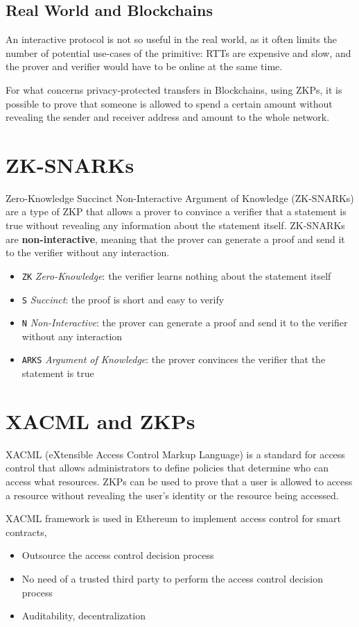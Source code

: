 \subsection{Real World and Blockchains}

An interactive protocol is not so useful in the real world, as it often limits the number of potential use-cases of the primitive:
RTTs are expensive and slow, and the prover and verifier would have to be online at the same time.

For what concerns privacy-protected transfers in Blockchains, using ZKPs, it is possible to prove that someone is allowed to spend a certain amount without revealing the sender and receiver address and amount to the whole network.

\section{ZK-SNARKs}

Zero-Knowledge Succinct Non-Interactive Argument of Knowledge (ZK-SNARKs) are a type of ZKP that allows a prover to convince a verifier that a statement is true without revealing any information about the statement itself. ZK-SNARKs are \textbf{non-interactive}, meaning that the prover can generate a proof and send it to the verifier without any interaction.
\begin{itemize}
   \item \texttt{ZK} \textit{Zero-Knowledge}: the verifier learns nothing about the statement itself
   \item \texttt{S} \textit{Succinct}: the proof is short and easy to verify
   \item \texttt{N} \textit{Non-Interactive}: the prover can generate a proof and send it to the verifier without any interaction
   \item \texttt{ARKS} \textit{Argument of Knowledge}: the prover convinces the verifier that the statement is true
\end{itemize}

\section{XACML and ZKPs}
XACML (eXtensible Access Control Markup Language) is a standard for access control that allows administrators to define policies that determine who can access what resources. ZKPs can be used to prove that a user is allowed to access a resource without revealing the user's identity or the resource being accessed.

XACML framework is used in Ethereum to implement access control for smart contracts, 
\begin{itemize}
   \item Outsource the access control decision process
   \item No need of a trusted third party to perform the access control decision
   process
   \item Auditability, decentralization
\end{itemize}

